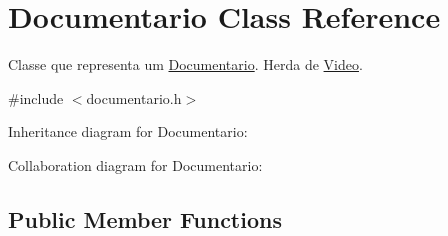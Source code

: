 \hypertarget{classDocumentario}{}\section{Documentario Class Reference}
\label{classDocumentario}


Classe que representa um \hyperlink{classDocumentario}{Documentario}. Herda de \hyperlink{classVideo}{Video}.  




{\ttfamily \#include $<$documentario.\+h$>$}



Inheritance diagram for Documentario\+:


Collaboration diagram for Documentario\+:
\subsection*{Public Member Functions}
